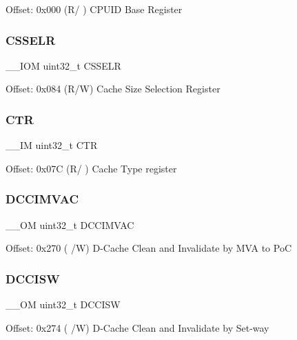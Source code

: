 Offset\+: 0x000 (R/ ) C\+P\+U\+ID Base Register \mbox{\label{struct_s_c_b___type_ae627674bc3ccfc2d67caccfc1f4ea4ed}} 
\subsubsection{\texorpdfstring{CSSELR}{CSSELR}}
{\footnotesize\ttfamily \+\_\+\+\_\+\+I\+OM uint32\+\_\+t C\+S\+S\+E\+LR}

Offset\+: 0x084 (R/W) Cache Size Selection Register \mbox{\label{struct_s_c_b___type_aad937861e203bb05ae22c4369c458561}} 
\subsubsection{\texorpdfstring{CTR}{CTR}}
{\footnotesize\ttfamily \+\_\+\+\_\+\+IM uint32\+\_\+t C\+TR}

Offset\+: 0x07C (R/ ) Cache Type register \mbox{\label{struct_s_c_b___type_a18ef4bf4fbbb205544985598b1bb64f4}} 
\subsubsection{\texorpdfstring{DCCIMVAC}{DCCIMVAC}}
{\footnotesize\ttfamily \+\_\+\+\_\+\+OM uint32\+\_\+t D\+C\+C\+I\+M\+V\+AC}

Offset\+: 0x270 ( /W) D-\/\+Cache Clean and Invalidate by M\+VA to PoC \mbox{\label{struct_s_c_b___type_ab6e447723358e736a9f69ffc88a97ba1}} 
\subsubsection{\texorpdfstring{DCCISW}{DCCISW}}
{\footnotesize\ttfamily \+\_\+\+\_\+\+OM uint32\+\_\+t D\+C\+C\+I\+SW}

Offset\+: 0x274 ( /W) D-\/\+Cache Clean and Invalidate by Set-\/way \mbox{\label{struct_s_c_b___type_acc23dc74d8f0378d81bc72302e325e50}} 
